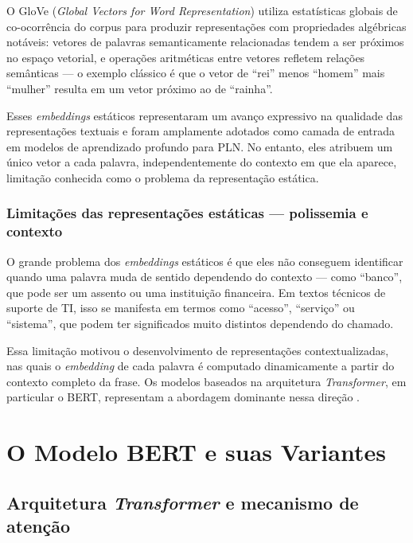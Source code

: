 \documentclass[
    12pt,                %
    openright,           %
    oneside,             %
    a4paper,             %
    english,             %
    brazil               %
]{abntex2}
\begin{document}
O GloVe (\textit{Global Vectors for Word Representation}) utiliza 
estatísticas globais de co-ocorrência do corpus para produzir 
representações com propriedades algébricas notáveis: vetores de 
palavras semanticamente relacionadas tendem a ser próximos no espaço 
vetorial, e operações aritméticas entre vetores refletem relações 
semânticas — o exemplo clássico é que o vetor de ``rei'' menos 
``homem'' mais ``mulher'' resulta em um vetor próximo ao de ``rainha''.

Esses \textit{embeddings} estáticos representaram um avanço expressivo na qualidade das representações textuais e foram amplamente adotados como camada de entrada em modelos de aprendizado profundo para PLN. No entanto, eles atribuem um único vetor a cada palavra, independentemente do contexto em que ela aparece, limitação conhecida como o problema da representação estática.

\subsubsection{Limitações das representações estáticas — polissemia e contexto}
\label{subsubsec:pln_limitacoes}

O grande problema dos \textit{embeddings} estáticos é que eles não 
conseguem identificar quando uma palavra muda de sentido dependendo 
do contexto — como ``banco'', que pode ser um assento ou uma 
instituição financeira. Em textos técnicos de suporte de TI, isso se 
manifesta em termos como ``acesso'', ``serviço'' ou ``sistema'', que 
podem ter significados muito distintos dependendo do chamado.

Essa limitação motivou o desenvolvimento de representações contextualizadas, nas quais o \textit{embedding} de cada palavra é computado dinamicamente a partir do contexto completo da frase. Os modelos baseados na arquitetura \textit{Transformer}, em particular o BERT, representam a abordagem dominante nessa direção \cite{devlin2019}.

\section{O Modelo BERT e suas Variantes}
\label{sec:bert}

\subsection{Arquitetura \textit{Transformer} e mecanismo de atenção}
\label{subsec:bert_transformer}
\end{document}
